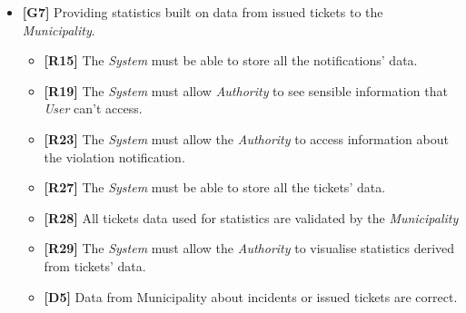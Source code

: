 \documentclass {article}
\begin{document}
\begin{itemize}
			  \begin{itemize}
			  \item {\bf [R15]} The {\it System} must be able to store all the notifications' data.
   		      \item {\bf [R19]} The {\it System} must allow {\it Authority} to see sensible information that {\it User} can't access.
			  \item {\bf [R23]} The {\it System} must allow the {\it Authority} to access information about the violation notification.
			  \item {\bf [R24]} The {\it System} must allow the {\it Authority} to validate a ticket.
			  \item {\bf [R25]} The {\it System} must allow the {\it Authority} to access sensible data about the violation.
			  \item {\bf [R26]} The {\it System} must advise the {\it Authority} that the violation details process is done correctly. 
			  \item {\bf [D5]} Data from Municipality about incidents or issued tickets are correct.
			  \item {\bf [D9]} Municipality is entitled to issue tickets even if the violation is not physically acknowledged.
			  \end{itemize}
			  \item {\bf [G7]} Providing statistics built on data from issued tickets to the {\it Municipality}.		
			  \begin{itemize}
			  \item {\bf [R15]} The {\it System} must be able to store all the notifications' data.
			  \item {\bf [R19]} The {\it System} must allow {\it Authority} to see sensible information that {\it User} can't access.
			  \item {\bf [R23]} The {\it System} must allow the {\it Authority} to access information about the violation notification.
			  \item {\bf [R27]} The {\it System} must be able to store all the tickets' data.
			  \item {\bf [R28]} All tickets data used for statistics are validated by the {\it Municipality}
			  \item {\bf [R29]} The {\it System} must allow the {\it Authority} to visualise statistics derived from tickets' data.
			  \item {\bf [D5]} Data from Municipality about incidents or issued tickets are correct.
			  \end{itemize}
	\end{itemize}
	\pagebreak
\end{document}
